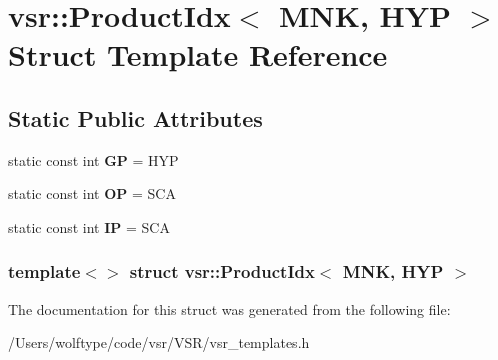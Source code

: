 \hypertarget{structvsr_1_1_product_idx_3_01_m_n_k_00_01_h_y_p_01_4}{\section{vsr\-:\-:Product\-Idx$<$ M\-N\-K, H\-Y\-P $>$ Struct Template Reference}
\label{structvsr_1_1_product_idx_3_01_m_n_k_00_01_h_y_p_01_4}
}
\subsection*{Static Public Attributes}
\begin{DoxyCompactItemize}
\item 
\hypertarget{structvsr_1_1_product_idx_3_01_m_n_k_00_01_h_y_p_01_4_af5eaddfd0670befa02f6bed77f1f200a}{static const int {\bfseries G\-P} = H\-Y\-P}\label{structvsr_1_1_product_idx_3_01_m_n_k_00_01_h_y_p_01_4_af5eaddfd0670befa02f6bed77f1f200a}

\item 
\hypertarget{structvsr_1_1_product_idx_3_01_m_n_k_00_01_h_y_p_01_4_ad20f60d096ae52bffaee160f43f4ba5e}{static const int {\bfseries O\-P} = S\-C\-A}\label{structvsr_1_1_product_idx_3_01_m_n_k_00_01_h_y_p_01_4_ad20f60d096ae52bffaee160f43f4ba5e}

\item 
\hypertarget{structvsr_1_1_product_idx_3_01_m_n_k_00_01_h_y_p_01_4_a102c6566dcb4bf0b45f0983fd3c045e9}{static const int {\bfseries I\-P} = S\-C\-A}\label{structvsr_1_1_product_idx_3_01_m_n_k_00_01_h_y_p_01_4_a102c6566dcb4bf0b45f0983fd3c045e9}

\end{DoxyCompactItemize}
\subsubsection*{template$<$$>$ struct vsr\-::\-Product\-Idx$<$ M\-N\-K, H\-Y\-P $>$}



The documentation for this struct was generated from the following file\-:\begin{DoxyCompactItemize}
\item 
/\-Users/wolftype/code/vsr/\-V\-S\-R/vsr\-\_\-templates.\-h\end{DoxyCompactItemize}
